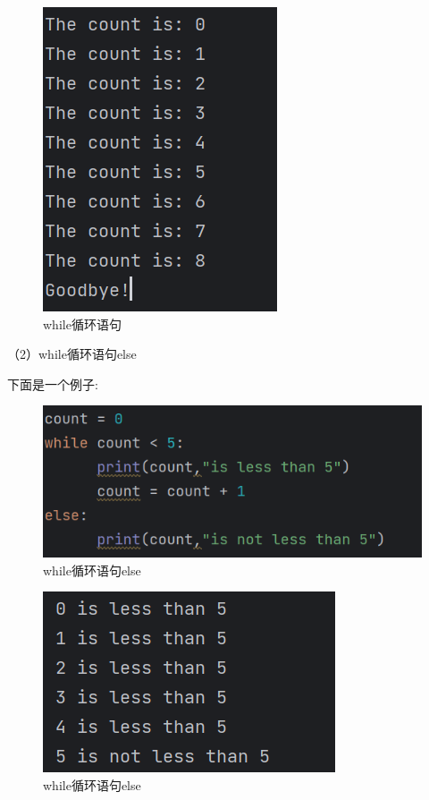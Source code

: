 \documentclass{ctexart}
\begin{document}
	\begin{figure}[H]
		\centering
		\includegraphics[scale=0.5]{3.16}
		\caption{while循环语句}
	\end{figure}
	
	
	（2）while循环语句else
	
	下面是一个例子:
	
	\begin{figure}[H]
		\centering
		\includegraphics[scale=0.5]{3.17}
		\caption{while循环语句else}
	\end{figure}
	
	\begin{figure}[H]
		\centering
		\includegraphics[scale=0.5]{3.18}
		\caption{while循环语句else}
	\end{figure}
	
\end{document}
